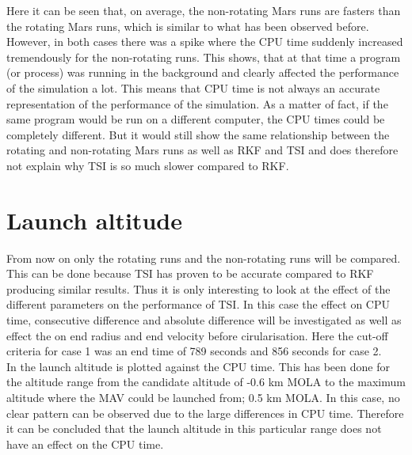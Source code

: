 \noindent
Here it can be seen that, on average, the non-rotating Mars runs are fasters than the rotating Mars runs, which is similar to what has been observed before. However, in both cases there was a spike where the CPU time suddenly increased tremendously for the non-rotating runs. This shows, that at that time a program (or process) was running in the background and clearly affected the performance of the simulation a lot. This means that CPU time is not always an accurate representation of the performance of the simulation. As a matter of fact, if the same program would be run on a different computer, the CPU times could be completely different. But it would still show the same relationship between the rotating and non-rotating Mars runs as well as \ac{RKF} and \ac{TSI} and does therefore not explain why \ac{TSI} is so much slower compared to \ac{RKF}.




\section{Launch altitude}
\label{sec:launchAltitude}
From now on only the rotating runs and the non-rotating runs will be compared. This can be done because \ac{TSI} has proven to be accurate compared to \ac{RKF} producing similar results. Thus it is only interesting to look at the effect of the different parameters on the performance of \ac{TSI}. In this case the effect on CPU time, consecutive difference and absolute difference will be investigated as well as effect the on end radius and end velocity before cirularisation. Here the cut-off criteria for case 1 was an end time of 789 seconds and 856 seconds for case 2.\\

\noindent
In  the launch altitude is plotted against the CPU time. This has been done for the altitude range from the candidate altitude of -0.6 km \ac{MOLA} to the maximum altitude where the \ac{MAV} could be launched from; 0.5 km \ac{MOLA}. In this case, no clear pattern can be observed due to the large differences in CPU time. Therefore it can be concluded that the launch altitude in this particular range does not have an effect on the CPU time.

